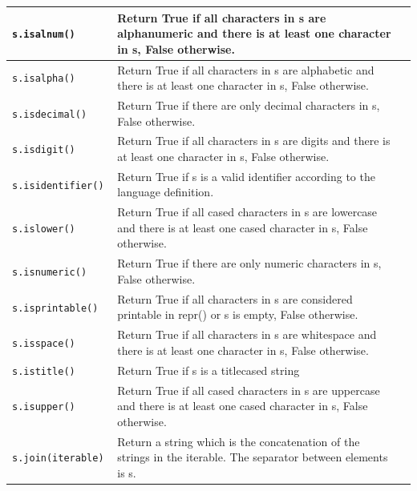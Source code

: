 \documentclass[9pt,a4wide]{extarticle}
\begin{document}
\begin{supertabular}{|l|p{9cm}|c|}
{\tt s.isalnum() }   &   Return True if all characters in s are alphanumeric
and there is at least one character in s, False otherwise.&        \\ \hline

{\tt s.isalpha() }   &  Return True if all characters in s are alphabetic
and there is at least one character in s, False otherwise.&        \\ \hline

{\tt s.isdecimal() }   &  Return True if there are only decimal characters in s,
False otherwise.
&        \\ \hline

{\tt s.isdigit() }   &  Return True if all characters in s are digits
and there is at least one character in s, False otherwise.  &        \\ \hline

{\tt s.isidentifier() }   &  Return True if s is a valid identifier according
to the language definition.  &        \\ \hline

{\tt s.islower() }   &  Return True if all cased characters in s are lowercase and there is at least one cased character in s, False otherwise.&        \\ \hline

{\tt s.isnumeric() }   &   Return True if there are only numeric characters in s, False otherwise.&        \\ \hline

{\tt s.isprintable() }   &  Return True if all characters in s are considered
printable in repr() or s is empty, False otherwise.&        \\ \hline

{\tt s.isspace() }   &  Return True if all characters in s are whitespace
and there is at least one character in s, False otherwise.&        \\ \hline

{\tt s.istitle() }   & Return True if s is a titlecased string  &        \\ \hline

{\tt s.isupper() }   &  Return True if all cased characters in s are uppercase and there is at least one cased character in s, False otherwise. &        \\ \hline

{\tt s.join(iterable) }   & Return a string which is the concatenation of the strings in the
iterable.  The separator between elements is s.&        \\ \hline


\end{supertabular}
\end{document}
